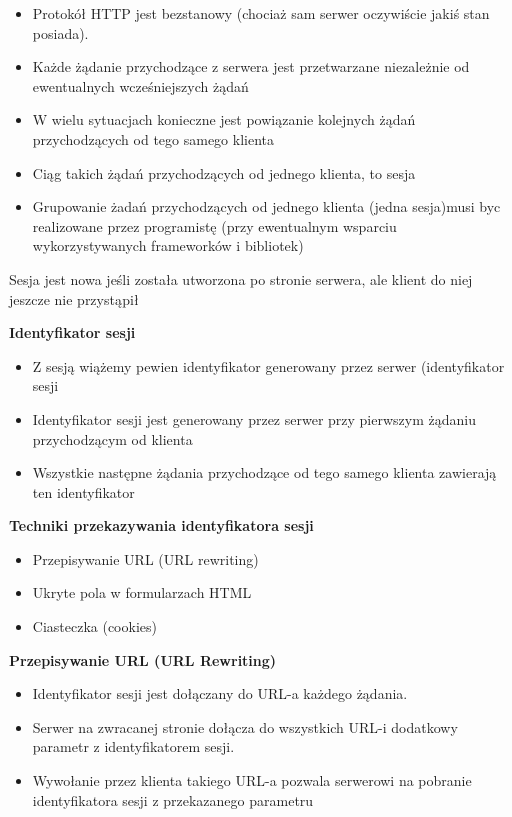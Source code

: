 \documentclass[../main.tex]{subfiles}
\begin{document}
    \begin{itemize}
        \item Protokół HTTP jest bezstanowy (chociaż sam serwer oczywiście jakiś stan posiada).
        \item Każde żądanie przychodzące z serwera jest przetwarzane niezależnie od ewentualnych wcześniejszych żądań
        \item W wielu sytuacjach konieczne jest powiązanie kolejnych żądań przychodzących od tego samego klienta
        \item Ciąg takich żądań przychodzących od jednego klienta, to sesja
        \item Grupowanie żadań przychodzących od jednego klienta (jedna sesja)musi byc realizowane przez programistę (przy ewentualnym wsparciu wykorzystywanych frameworków i bibliotek)
    \end{itemize}

    \begin{theorem}
        Sesja jest nowa jeśli została utworzona po stronie serwera,
        ale klient do niej jeszcze nie przystąpił
    \end{theorem}

    \textbf{Identyfikator sesji}
    \begin{itemize}
        \item Z sesją wiążemy pewien identyfikator generowany przez serwer (identyfikator sesji
        \item Identyfikator sesji jest generowany przez serwer przy pierwszym żądaniu przychodzącym od klienta
        \item Wszystkie następne żądania przychodzące od tego samego klienta zawierają ten identyfikator
    \end{itemize}

    \textbf{Techniki przekazywania identyfikatora sesji}
    \begin{itemize}
        \item Przepisywanie URL (URL rewriting)
        \item Ukryte pola w formularzach HTML
        \item Ciasteczka (cookies)
    \end{itemize}

    \textbf{Przepisywanie URL (URL Rewriting)}
    \begin{itemize}
        \item Identyfikator sesji jest dołączany do URL-a każdego żądania.
        \item Serwer na zwracanej stronie dołącza do wszystkich URL-i dodatkowy parametr z identyfikatorem sesji.
        \item Wywołanie przez klienta takiego URL-a pozwala serwerowi na pobranie identyfikatora sesji z przekazanego parametru
    \end{itemize}
\end{document}
